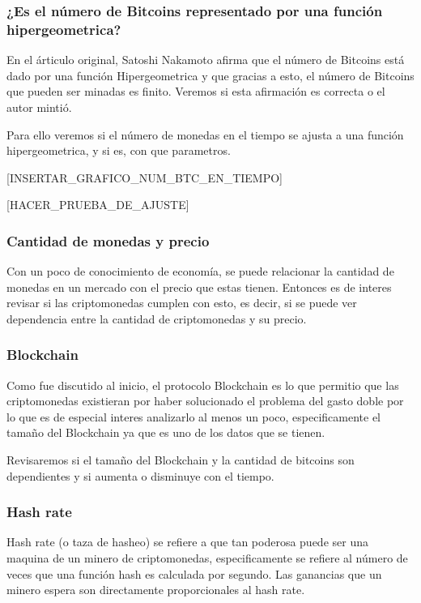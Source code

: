 \documentclass[12pt,letterpaper]{article}
\begin{document}
    \subsubsection*{¿Es el número de Bitcoins representado por una función hipergeometrica?}

    En el árticulo original, Satoshi Nakamoto afirma que el número de Bitcoins está dado por una función Hipergeometrica y que gracias a esto, el número de Bitcoins que pueden ser minadas es finito.
    Veremos si esta afirmación es correcta o el autor mintió.

    Para ello veremos si el número de monedas en el tiempo se ajusta a una función hipergeometrica, y si es, con que parametros.

    [INSERTAR_GRAFICO_NUM_BTC_EN_TIEMPO]

    [HACER_PRUEBA_DE_AJUSTE]

    \subsubsection*{Cantidad de monedas y precio}

    Con un poco de conocimiento de economía, se puede relacionar la cantidad de monedas en un mercado con el precio que estas tienen. Entonces es de interes revisar si las criptomonedas cumplen con esto, es decir, si se puede ver dependencia entre la cantidad de criptomonedas y su precio.

    \subsubsection*{Blockchain}

    Como fue discutido al inicio, el protocolo Blockchain es lo que permitio que las criptomonedas existieran por haber solucionado el problema del gasto doble por lo que es de especial interes analizarlo al menos un poco, especificamente el tamaño del Blockchain ya que es uno de los datos que se tienen.

    Revisaremos si el tamaño del Blockchain y la cantidad de bitcoins son dependientes y si aumenta o disminuye con el tiempo.

    \subsubsection*{Hash rate}

    Hash rate (o taza de hasheo) se refiere a que tan poderosa puede ser una maquina de un minero de criptomonedas, especificamente se refiere al número de veces que una función hash es calculada por segundo. Las ganancias que un minero espera son directamente proporcionales al hash rate.
\end{document}
